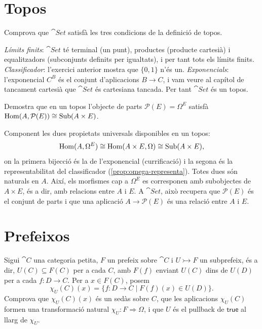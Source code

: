 \section{Topos}

\begin{exercici}
Comprova que $\cat{Set}$ satisfà les tres condicions de la definició de topos.
\end{exercici}

\begin{solucio}
\emph{Límits finits}: $\cat{Set}$ té terminal (un punt), productes (producte cartesià) i equalitzadors (subconjunts definits per igualtats), i per tant tots els límits finits. \emph{Classificador}: l'exercici anterior mostra que $\{0,1\}$ n'és un. \emph{Exponencials}: l'exponencial $C^{B}$ és el conjunt d'aplicacions $B\to C$, i vam veure al capítol de tancament cartesià que $\cat{Set}$ és cartesiana tancada. Per tant $\cat{Set}$ és un topos.
\end{solucio}

\begin{exercici}
Demostra que en un topos l'objecte de parts $\mathcal{P}(E)=\Omega^{E}$ satisfà $\operatorname{Hom}(A,\mathcal{P}(E))\cong\operatorname{Sub}(A\times E)$.
\end{exercici}

\begin{solucio}
Component les dues propietats universals disponibles en un topos:
\[
\operatorname{Hom}(A,\Omega^{E})\cong\operatorname{Hom}(A\times E,\Omega)\cong\operatorname{Sub}(A\times E),
\]
on la primera bijecció és la de l'exponencial (currificació) i la segona és la representabilitat del classificador (\ref{prop:omega-representa}). Totes dues són naturals en $A$. Així, els morfismes cap a $\Omega^{E}$ es corresponen amb subobjectes de $A\times E$, és a dir, amb relacions entre $A$ i $E$. A $\cat{Set}$, això recupera que $\mathcal{P}(E)$ és el conjunt de parts i que una aplicació $A\to\mathcal{P}(E)$ és una relació entre $A$ i $E$.
\end{solucio}

\section{Prefeixos}

\begin{exercici}\label{pr-sedassos}
Sigui $\cat{C}$ una categoria petita, $F$ un prefeix sobre $\cat{C}$ i $U\rightarrowtail F$ un subprefeix, és a dir, $U(C)\subseteq F(C)$ per a cada $C$, amb $F(f)$ enviant $U(C)$ dins de $U(D)$ per a cada $f\colon D\to C$. Per a $x\in F(C)$, posem
\[
\chi_U(C)(x)=\{f\colon D\to C\mid F(f)(x)\in U(D)\}.
\]
Comprova que $\chi_U(C)(x)$ és un sedàs sobre $C$, que les aplicacions $\chi_U(C)$ formen una transformació natural $\chi_U\colon F\Rightarrow\Omega$, i que $U$ és el pullback de $\mathsf{true}$ al llarg de $\chi_U$.
\end{exercici}

